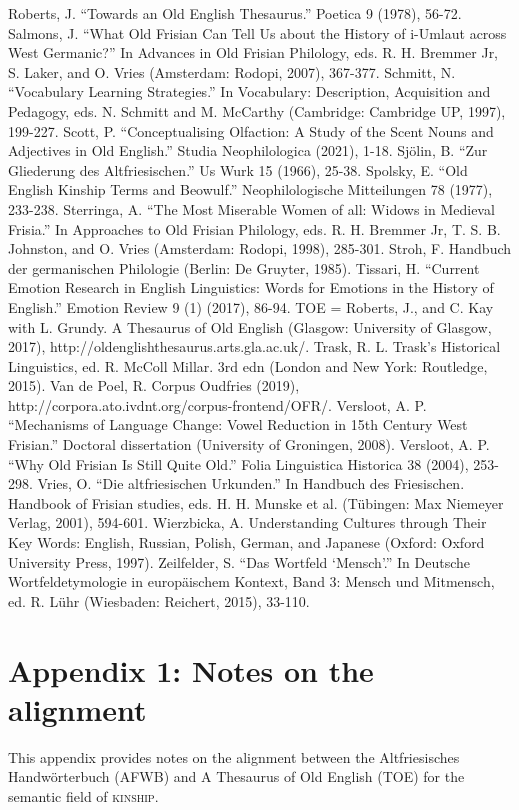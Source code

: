 Roberts, J. “Towards an Old English Thesaurus.” Poetica 9 (1978), 56-72.
Salmons, J. “What Old Frisian Can Tell Us about the History of i-Umlaut across West Germanic?” In Advances in Old Frisian Philology, eds. R. H. Bremmer Jr, S. Laker, and O. Vries (Amsterdam: Rodopi, 2007), 367-377.
Schmitt, N. “Vocabulary Learning Strategies.” In Vocabulary: Description, Acquisition and Pedagogy, eds. N. Schmitt and M. McCarthy (Cambridge: Cambridge UP, 1997), 199-227.
Scott, P. “Conceptualising Olfaction: A Study of the Scent Nouns and Adjectives in Old English.” Studia Neophilologica (2021), 1-18.
Sjölin, B. “Zur Gliederung des Altfriesischen.” Us Wurk 15 (1966), 25-38.
Spolsky, E. “Old English Kinship Terms and Beowulf.” Neophilologische Mitteilungen 78 (1977), 233-238.
Sterringa, A. “The Most Miserable Women of all: Widows in Medieval Frisia.” In Approaches to Old Frisian Philology, eds. R. H. Bremmer Jr, T. S. B. Johnston, and O. Vries (Amsterdam: Rodopi, 1998), 285-301.
Stroh, F. Handbuch der germanischen Philologie (Berlin: De Gruyter, 1985).
Tissari, H. “Current Emotion Research in English Linguistics: Words for Emotions in the History of English.” Emotion Review 9 (1) (2017), 86-94.
TOE = Roberts, J., and C. Kay with L. Grundy. A Thesaurus of Old English (Glasgow: University of Glasgow, 2017), http://oldenglishthesaurus.arts.gla.ac.uk/.
Trask, R. L. Trask’s Historical Linguistics, ed. R. McColl Millar. 3rd edn (London and New York: Routledge, 2015).
Van de Poel, R. Corpus Oudfries (2019), http://corpora.ato.ivdnt.org/corpus-frontend/OFR/.
Versloot, A. P. “Mechanisms of Language Change: Vowel Reduction in 15th Century West Frisian.” Doctoral dissertation (University of Groningen, 2008).
Versloot, A. P. “Why Old Frisian Is Still Quite Old.” Folia Linguistica Historica 38 (2004), 253-298. 
Vries, O. “Die altfriesischen Urkunden.” In Handbuch des Friesischen. Handbook of Frisian studies, eds. H. H. Munske et al. (Tübingen: Max Niemeyer Verlag, 2001), 594-601.
Wierzbicka, A. Understanding Cultures through Their Key Words: English, Russian, Polish, German, and Japanese (Oxford: Oxford University Press, 1997).
Zeilfelder, S. “Das Wortfeld ‘Mensch’.” In Deutsche Wortfeldetymologie in europäischem Kontext, Band 3: Mensch und Mitmensch, ed. R. Lühr (Wiesbaden: Reichert, 2015), 33-110.

\section{Appendix 1: Notes on the alignment}
This appendix provides notes on the alignment between the Altfriesisches Handwörterbuch (AFWB) and A Thesaurus of Old English (TOE) for the semantic field of \textsc{kinship}.

